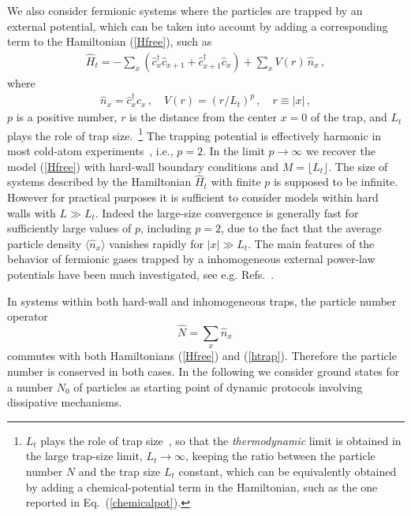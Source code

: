   We also consider fermionic systems where the particles are trapped by
  an external potential, which can be taken into account by adding a
  corresponding term to the Hamiltonian (\ref{Hfree}), such as
  \begin{eqnarray}
    \hat H_t =
    - \sum _x 
    (\hat c_{x}^\dagger \hat c_{x+1} +  \hat c_{x+1}^\dagger \hat c_{x})
  +  \sum_x V(r) \, \hat n_x\,,\label{htrap}
    \end{eqnarray}
  where 
  \begin{eqnarray}
  \hat n_x =
  \hat c_x^\dagger c_x\,,\quad  V(r)= (r/L_t)^p\,, \quad r\equiv |x|\,,
     \label{potential}
  \end{eqnarray}
  $p$ is a positive number, $r$ is the distance from the center $x=0$ of
  the trap, and $L_t$ plays the role of trap size.~\footnote{$L_t$ plays
  the role of trap size~\cite{BDZ-08,RM-04,CV-10-2}, so that the {\em
    thermodynamic} limit is obtained in the large trap-size limit,
  $L_t\to \infty$, keeping the ratio between the particle number $N$ and
  the trap size $L_t$ constant, which can be equivalently obtained by
  adding a chemical-potential term in the Hamiltonian, such as the one
  reported in Eq.~(\ref{chemicalpot}).}  The trapping potential is
  effectively harmonic in most cold-atom experiments~\cite{BDZ-08},
  i.e., $p=2$.  In the limit $p\to\infty$ we recover the model
  (\ref{Hfree}) with hard-wall boundary conditions and $M=\lfloor L_t
  \rfloor$.  The size of systems described by the Hamiltonian $\hat H_t$
  with finite $p$ is supposed to be infinite. However for practical
  purposes it is sufficient to consider models within hard walls with $L
  \gg L_t$. Indeed the large-size convergence is generally fast for
  sufficiently large values of $p$, including $p=2$, due to the fact
  that the average particle density $\langle \hat{n}_x \rangle$ vanishes
  rapidly for $|x|\gg L_t$. The main features of the behavior of fermionic
  gases trapped by a inhomogeneous external power-law potentials have
  been much investigated, see e.g.
  Refs.~\cite{ACV-14,Nigro-17,CV-10,CV-10-2,Pollet-12}.
  
  In systems within both hard-wall and inhomogeneous traps, the particle
  number operator
  \begin{equation}
    \hat{N} = \sum_x \hat n_{x}\,
  \label{partnum}
    \end{equation}
  commutes with both Hamiltonians (\ref{Hfree}) and
  (\ref{htrap}). Therefore the particle number is conserved in both
  cases.  In the following we consider ground states for a number $N_0$
  of particles as starting point of dynamic protocols involving
  dissipative mechanisms.
  
